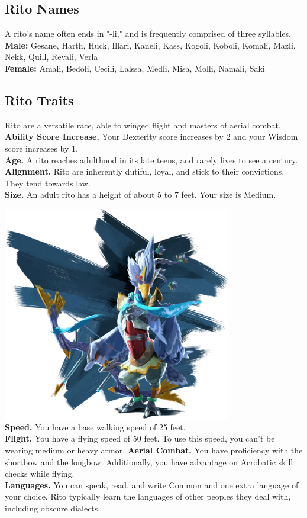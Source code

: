 \documentclass[10pt,twoside,twocolumn,openany]{book}
\begin{document}
\subsection{Rito Names}
A rito's name often ends in "-li," and is frequently comprised of three syllables.\\
\textbf{Male:} Gesane, Harth, Huck, Illari, Kaneli, Kass, Kogoli, Koboli, Komali, Mazli, Nekk, Quill, Revali, Verla\\
\textbf{Female:} Amali, Bedoli, Cecili, Lalssa, Medli, Misa, Molli, Namali, Saki

\subsection{Rito Traits}
Rito are a versatile race, able to winged flight and masters of aerial combat.\\
\indent \textbf{Ability Score Increase.} Your Dexterity score increases by 2 and your Wisdom score increases by 1.\\
\indent \textbf{Age.} A rito reaches adulthood in its late teens, and rarely lives to see a century.\\
\indent \textbf{Alignment.} Rito are inherently dutiful, loyal, and stick to their convictions. They tend towards law. \\
\indent \textbf{Size.} An adult rito has a height of about 5 to 7 feet. Your size is Medium.

\includegraphics[width=100mm,scale=0.5]{img/revali.png} \\

\indent \textbf{Speed.} You have a base walking speed of 25 feet.\\
\indent \textbf{Flight.} You have a flying speed of 50 feet. To use this
speed, you can’t be wearing medium or heavy armor.
\indent \textbf{Aerial Combat.} You have proficiency with the shortbow and the longbow. Additionally, you have advantage on Acrobatic skill checks while flying.\\
\indent \textbf{Languages.} You can speak, read, and write Common and one extra language of your choice. Rito typically learn the languages of other peoples they deal with, including obscure dialects.
\end{document}
